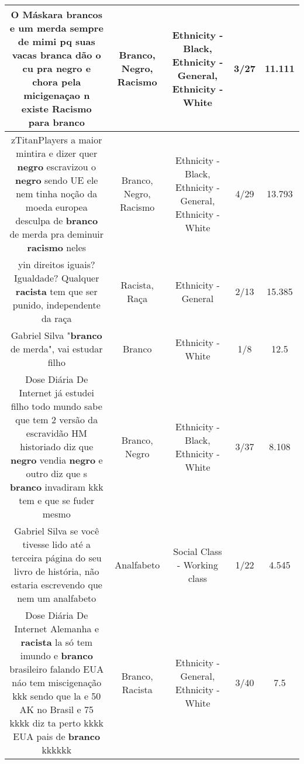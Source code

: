 \documentclass[11pt]{article}
\newlength\mylength
\begin{document}
\begin{center}
\begin{longtable}{|C{.65\mylength}|C{.30\mylength}|C{.12\mylength}|C{.12\mylength}|C{.12\mylength}|}
  \small O Máskara brancos e um merda sempre de mimi pq suas vacas branca dão o cu pra \textbf{negro} e chora pela micigenaçao n existe \textbf{Racismo} para branco\normalsize   & Branco, Negro, Racismo & Ethnicity - Black, Ethnicity - General, Ethnicity - White & 3/27 & 11.111 \\  \hline
  \small zTitanPlayers a maior mintira e dizer quer \textbf{negro} escravizou o \textbf{negro} sendo UE ele nem tinha noção da moeda europea desculpa de \textbf{branco} de merda pra deminuir \textbf{racismo} neles\normalsize   & Branco, Negro, Racismo & Ethnicity - Black, Ethnicity - General, Ethnicity - White & 4/29 & 13.793 \\  \hline
  \small yin direitos iguais? Igualdade? Qualquer \textbf{racista} tem que ser punido, independente da raça\normalsize   & Racista, Raça & Ethnicity - General & 2/13 & 15.385 \\  \hline
  \small Gabriel Silva "\textbf{branco} de merda", vai estudar filho\normalsize   & Branco & Ethnicity - White & 1/8 & 12.5 \\  \hline
  \small Dose Diária De Internet já estudei filho  todo mundo sabe que tem 2 versão da escravidão HM historiado diz que \textbf{negro} vendia \textbf{negro} e outro diz que s \textbf{branco} invadiram  kkk tem e que se fuder mesmo\normalsize   & Branco, Negro & Ethnicity - Black, Ethnicity - White & 3/37 & 8.108 \\  \hline
  \small Gabriel Silva se você tivesse lido até a terceira página do seu livro de história, não estaria escrevendo que nem um analfabeto\normalsize   & Analfabeto & Social Class - Working class & 1/22 & 4.545 \\  \hline
  \small Dose Diária De Internet Alemanha e \textbf{racista} la só tem  imundo  e \textbf{branco} brasileiro falando EUA náo tem miscigenação kkk sendo que la e 50 AK no Brasil e 75 kkkk diz ta perto kkkk EUA pais de \textbf{branco} kkkkkk\normalsize   & Branco, Racista & Ethnicity - General, Ethnicity - White & 3/40 & 7.5 \\  \hline

\end{longtable}
\end{center}
\end{document}
